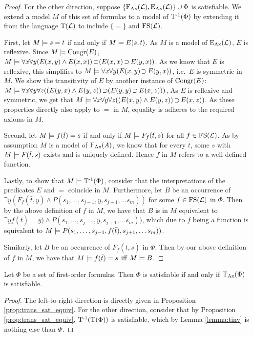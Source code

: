 \begin{proof}
	For the other direction, suppose $\{\operatorname{F_{Ax}}(\operatorname{\mathcal{L}}), \operatorname{E_{Ax}}(\operatorname{\mathcal{L}})\} \cup \Phi$ is satisfiable.
	We extend a model $M$ of this set of formulas to a model of $\operatorname{T^{-1}}(\Phi)$ by extending it from the language $\operatorname{T}(\operatorname{\mathcal{L}})$ to include $\{=\}$ and $\operatorname{FS}(\operatorname{\mathcal{L}})$.

	First, let $M\models s = t$ if and only if $M\models E(s, t)$.
	As $M$ is a model of $\operatorname{E_{Ax}}(\operatorname{\mathcal{L}})$, $E$ is reflexive. 
	Since $M \models \operatorname{Congr}(E)$,
	$M \entails \forall x \forall y (E(x, y) \land E(x, x)) \limpl ( E(x, x) \limpl\nolinebreak E(y, x))$.
	As we know that $E$ is reflexive, this simplifies to
	$M \entails \forall x \forall y (E(x, y)\limpl\nolinebreak E(y, x))$, i.e.~$E$ is symmetric in $M$.
	We show the transitivity of $E$ by another instance of $\operatorname{Congr}(E)$: 
	$M \entails \forall x \forall y \forall z ((E(y, x) \land E(y, z)) \limpl ( E(y, y) \limpl\nolinebreak E(x, z)))$,
	As $E$ is reflexive and symmetric, we get that 
	$M \entails \forall x \forall y \forall z ((E(x, y) \land E(y, z)) \limpl\nolinebreak E(x, z))$.
	As these properties directly also apply to $=$ in $M$, equality is adheres to the required axioms in $M$.

	Second, let $M\models f(\bar t) = s$ if and only if $M\models F_f(\bar t, s)$ for all $f \in \operatorname{FS}(\operatorname{\mathcal{L}})$.
	As by assumption $M$ is a model of $\operatorname{F_{Ax}}(A)$, we know that for every $\bar t$, some $s$ with $M\models F(\bar t, s)$ exists and is uniquely defined.
	Hence $f$ in $M$ refers to a well-defined function.

	Lastly, to show that $M \models \operatorname{T^{-1}}(\Phi)$, 
	consider that the interpretations of the predicates $E$ and $=$ coincide in $M$.
	Furthermore, let $B$ be an occurrence of $\exists y (F_f(\bar t, y) \land P(s_1, \ldots, s_{j-1}, y, s_{j+1}, \ldots s_m))$ for some $f \in \operatorname{FS}(\operatorname{\mathcal{L}})$ in $\Phi$.
	Then by the above definition of $f$ in $M$, we have that $B$ is in $M$ equivalent to $\exists y f(\bar t) = y) \land P(s_1, \ldots, s_{j-1}, y, s_{j+1}, \ldots s_m))$, which due to $f$ being a function is equivalent to 
	$M \models P(s_1, \ldots, s_{j-1}, f(\bar t), s_{j+1}, \ldots s_m))$.

	Similarly, let $B$ be an occurrence of $F_f(\bar t, s)$ in $\Phi$.
	Then by our above definition of $f$ in $M$, we have that $M \models f(\bar t) = s$ iff $M \models B$.
\end{proof}

\begin{corr}
	Let $\Phi$ be a set of first-order formulas.
	Then $\Phi$ is satisfiable if and only if $\operatorname{\operatorname{T}_{Ax}}(\Phi)$ is satisfiable.
\end{corr}
\begin{proof}
	The left-to-right direction is directly given in Proposition \ref{prop:trans_sat_equiv}.
	For the other direction, consider that by Proposition \ref{prop:trans_sat_equiv}, $\operatorname{T^{-1}}(\operatorname{T}(\Phi))$ is satisfiable, which by Lemma \ref{lemma:tinv} is nothing else than $\Phi$.
\end{proof}



